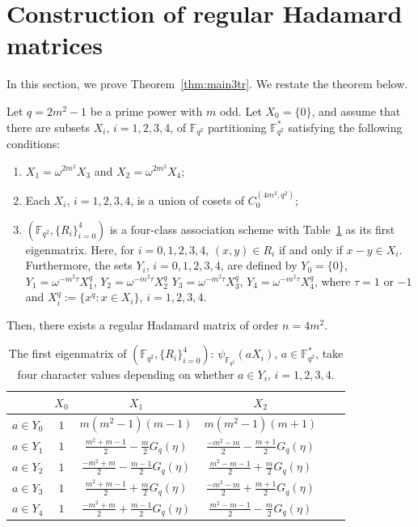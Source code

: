 \documentclass[ALCO,ThmDefs,Unicode]{cedram}
\newcommand*\F{{\mathbb F}}
\begin{document}
\section{Construction of regular Hadamard matrices}\label{sec:const3}

In this section, we prove Theorem~\ref{thm:main3tr}. We restate the theorem below.

\begin{theo}\label{thm:main3}
Let $q=2m^2-1$ be a prime power with $m$ odd. Let $X_0=\{0\}$, and assume that there are subsets $X_i$, $i=1,2,3,4$, of $\F_{q^2}$ partitioning $\F_{q^2}^\ast$ satisfying the following conditions:
\begin{enumerate}
\item $X_1=\omega^{2m^2}X_3$ and $X_2=\omega^{2m^2}X_4$;
\item Each $X_i$, $i=1,2,3,4$, is a union of cosets of $C_0^{(4m^2,q^2)}$;
\item $(\F_{q^2},\{R_i\}_{i=0}^4)$ is a four-class association scheme with Table~\ref{tab_1} as its first eigenmatrix. Here, for $i=0,1,2,3,4$, $(x,y)\in R_i$ if and only if $x-y \in X_i$. Furthermore, the sets $Y_i$, $i=0,1,2,3,4$, are defined by $Y_0=\{0\}$, $Y_1=\omega^{-m^2\tau}X_1^q$, $Y_2=\omega^{-m^2\tau}X_2^q$ $Y_3=\omega^{-m^2\tau}X_3^q$, $Y_4=\omega^{-m^2\tau}X_4^q$, where $\tau=1$ or $-1$ and $X_i^q:=\{x^q:x\in X_i\}$, $i=1,2,3,4$.
\end{enumerate}
Then, there exists a regular Hadamard matrix of order $n=4m^2$.
\begin{table}[!h]
\begin{center}
\caption{\label{tab_1}
The first eigenmatrix of $(\F_{q^2},\{R_i\}_{i=0}^4)$: $\psi_{\F_{q^2}}(aX_i)$, $a\in \F_{q^2}^\ast$, take four character values depending on whether $a\in Y_i$, $i=1,2,3,4$. }
\begin{tabular}{|c||c|c|c|c|c|}\hline
&$X_0$&$X_1$& $X_2$ \\ \hline \hline $a\in Y_0$&$1$&$m(m^2-1)(m-1)$ &$m(m^2-1)(m+1)$ \\\hline $a\in Y_{1}$&$1$ &$\frac{m^2+m-1}{2}-\frac{m}{2}G_q(\eta)$ & $\frac{-m^2-m}{2}-\frac{m+1}{2}G_q(\eta)$ \\\hline $a\in Y_2$&$1$& $\frac{-m^2+m}{2}-\frac{m-1}{2}G_q(\eta)$& $\frac{m^2-m-1}{2}+\frac{m}{2}G_q(\eta)$ \\\hline $a\in Y_{3}$&$1$& $\frac{m^2+m-1}{2}+\frac{m}{2}G_q(\eta)$ & $\frac{-m^2-m}{2}+\frac{m+1}{2}G_q(\eta)$ \\\hline $a\in Y_4$&$1$ &$\frac{-m^2+m}{2}+\frac{m-1}{2}G_q(\eta)$ & $\frac{m^2-m-1}{2}-\frac{m}{2}G_q(\eta)$ \\\hline

\end{tabular}
\end{center}
\end{table}
\end{theo}
\end{document}
